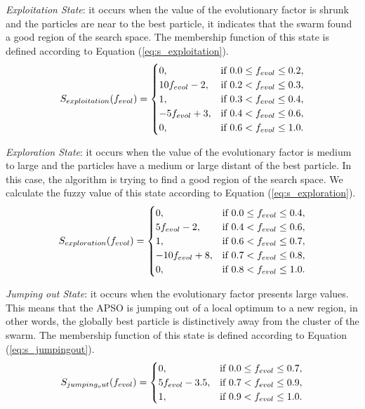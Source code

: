 \emph{Exploitation State}: it occurs when the value of the evolutionary factor is shrunk and the particles are near to the best particle, it indicates that the swarm found a good region of the search space. The membership function of this state is defined according to Equation (\ref{eq:s_exploitation}).
\begin{equation}
S_{exploitation}(f_{evol}) = \begin{cases}
0,                &\mbox{if $ 0.0 \leq f_{evol} \leq 0.2 $}, \\
10f_{evol} - 2,   &\mbox{if $ 0.2 <    f_{evol} \leq 0.3 $}, \\
1,                &\mbox{if $ 0.3 <    f_{evol} \leq 0.4 $}, \\
-5f_{evol} + 3,   &\mbox{if $ 0.4 <    f_{evol} \leq 0.6 $}, \\
0,                &\mbox{if $ 0.6 <    f_{evol} \leq 1.0 $}.
\end{cases}
\label{eq:s_exploitation}
\end{equation}

\emph{Exploration State}: it occurs when the value of the evolutionary factor is medium to large and the particles have a medium or large distant of the best particle. In this case, the algorithm is trying to find a good region of the search space. We calculate the fuzzy value of this state according to Equation (\ref{eq:s_exploration}).
\begin{equation}
S_{exploration}(f_{evol}) = \begin{cases}
0,                &\mbox{if $ 0.0 \leq f_{evol}  \leq 0.4 $}, \\
5f_{evol} - 2,    &\mbox{if $ 0.4   <  f_{evol}  \leq 0.6 $}, \\
1,                &\mbox{if $ 0.6   <  f_{evol}  \leq 0.7 $}, \\
-10f_{evol} + 8,  &\mbox{if $ 0.7   <  f_{evol}  \leq 0.8 $},  \\
0,                &\mbox{if $ 0.8   <  f_{evol}  \leq 1.0 $}.
\end{cases}
\label{eq:s_exploration}
\end{equation}

\emph{Jumping out State}: it occurs when the evolutionary factor presents large values. This means that the APSO is jumping out of a local optimum to a new region, in other words, the globally best particle is distinctively away from the cluster of the swarm. The membership function of this state is defined according to Equation (\ref{eq:s_jumpingout}).
\begin{equation}
S_{jumping_out}(f_{evol}) = \begin{cases}
0,                  &\mbox{if $ 0.0 \leq f_{evol} \leq 0.7 $}, \\
5f_{evol} - 3.5,    &\mbox{if $ 0.7    < f_{evol} \leq 0.9 $}, \\
1,                  &\mbox{if $ 0.9    < f_{evol} \leq 1.0 $}.
\end{cases}
\label{eq:s_jumpingout}
\end{equation}

